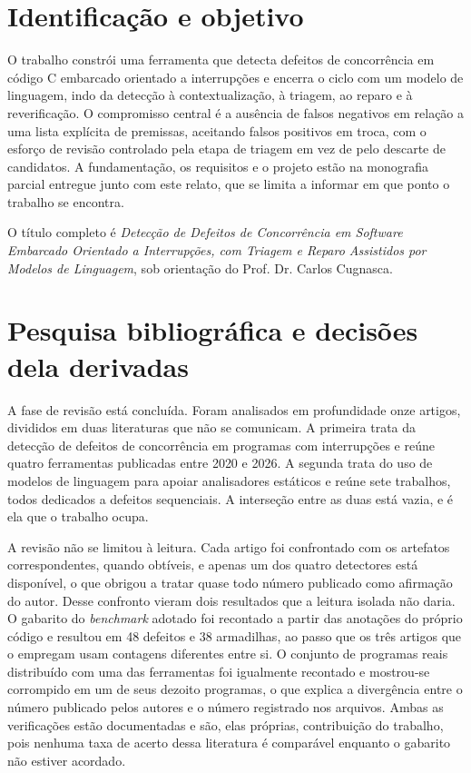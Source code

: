 \documentclass[article,12pt,oneside,a4paper,english,brazil]{abntex2}
\begin{document}
\frenchspacing

\imprimirfolhaderosto

\section{Identificação e objetivo}

O trabalho constrói uma ferramenta que detecta defeitos de concorrência em
código C embarcado orientado a interrupções e encerra o ciclo com um modelo de
linguagem, indo da detecção à contextualização, à triagem, ao reparo e à
reverificação. O compromisso central é a ausência de falsos negativos em
relação a uma lista explícita de premissas, aceitando falsos positivos em
troca, com o esforço de revisão controlado pela etapa de triagem em vez de pelo
descarte de candidatos. A fundamentação, os requisitos e o projeto estão na
monografia parcial entregue junto com este relato, que se limita a informar em
que ponto o trabalho se encontra.

O título completo é \emph{Detecção de Defeitos de Concorrência em Software
Embarcado Orientado a Interrupções, com Triagem e Reparo Assistidos por Modelos
de Linguagem}, sob orientação do Prof. Dr. Carlos Cugnasca.

\section{Pesquisa bibliográfica e decisões dela derivadas}

A fase de revisão está concluída. Foram analisados em profundidade onze artigos,
divididos em duas literaturas que não se comunicam. A primeira trata da detecção
de defeitos de concorrência em programas com interrupções e reúne quatro
ferramentas publicadas entre 2020 e 2026. A segunda trata do uso de modelos de
linguagem para apoiar analisadores estáticos e reúne sete trabalhos, todos
dedicados a defeitos sequenciais. A interseção entre as duas está vazia, e é ela
que o trabalho ocupa.

A revisão não se limitou à leitura. Cada artigo foi confrontado com os artefatos
correspondentes, quando obtíveis, e apenas um dos quatro detectores está
disponível, o que obrigou a tratar quase todo número publicado como afirmação do
autor. Desse confronto vieram dois resultados que a leitura isolada não daria. O
gabarito do \textit{benchmark} adotado foi recontado a partir das anotações do
próprio código e resultou em 48 defeitos e 38 armadilhas, ao passo que os três
artigos que o empregam usam contagens diferentes entre si. O conjunto de
programas reais distribuído com uma das ferramentas foi igualmente recontado e
mostrou-se corrompido em um de seus dezoito programas, o que explica a
divergência entre o número publicado pelos autores e o número registrado nos
arquivos. Ambas as verificações estão documentadas e são, elas próprias,
contribuição do trabalho, pois nenhuma taxa de acerto dessa literatura é
comparável enquanto o gabarito não estiver acordado.
\end{document}
